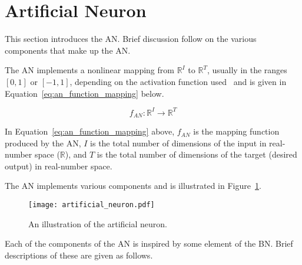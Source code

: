 \section{Artificial Neuron}\label{sec:anns:an}

This section introduces the \acs{AN}. Brief discussion follow on the various components that make up the \acs{AN}.

The \acs{AN} implements a nonlinear mapping from $\mathbb{R}^{I}$ to
$\mathbb{R}^{T}$, usually in the ranges $[0,1]$ or $[-1,1]$, depending on the
activation function used~\cite{ref:engelbrecht:2007} and is given
in Equation~\eqref{eq:an_function_mapping} below.

\begin{equation}
      f_{AN} \colon \mathbb{R}^{I} \to \mathbb{R}^{T}
      \label{eq:an_function_mapping}
\end{equation}

\noindent
In Equation~\eqref{eq:an_function_mapping} above, $f_{AN}$ is the mapping function produced by the \acs{AN}, $I$ is the total number of dimensions of the input in real-number space ($\mathbb{R}$), and $T$ is the total number of dimensions of the target (desired output) in real-number space.

The \acs{AN} implements various components and is illustrated in Figure~\ref{fig:artificial_neuron}.

\begin{figure}[htpb]
      \centering
      \texttt{[image: artificial\_neuron.pdf]}
      \caption[The artificial neuron]{An illustration of the artificial neuron.}
      \label{fig:artificial_neuron}
\end{figure}

\noindent
Each of the components of the \acs{AN} is inspired by some element of the \acs{BN}. Brief descriptions of these are given as follows.

